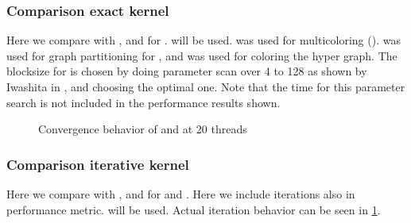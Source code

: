 \subsubsection{Comparison exact kernel}
Here we compare  \RACE with \ABMC, \MC and \MKL for \SymmSpmv.  will be used. \COLPACK \cite{COLPACK} %
was used for multicoloring (\MC). \METIS \cite{METIS}  was used for graph partitioning for \ABMC, and \COLPACK was used for coloring the hyper graph. The blocksize for \ABMC is chosen by doing parameter scan over 4 to 128 as shown by Iwashita \etal in \cite{ABMC}, and choosing the optimal one. Note that the time for this parameter search is not included in the performance results shown. 


\begin{figure}[thbp]
	\centering
	\hspace{1.2em}
	\caption{Convergence behavior of \SYMMGS and \SYMMKACZ at 20 threads}
	\label{fig:conv_behavior}
\end{figure}

\subsubsection{Comparison iterative kernel}
Here we compare  \RACE with \ABMC, \MC and \MKL for \GS and \KACZ. Here we include iterations also in performance metric.  will be used. Actual iteration behavior can be seen in \cref{fig:conv_behavior}.


